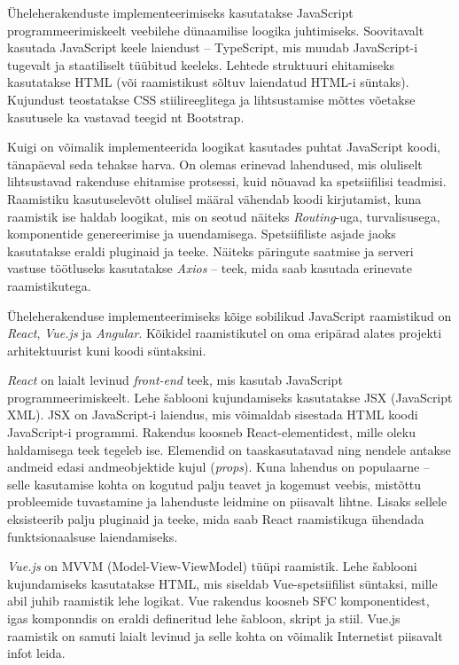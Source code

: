 Üheleherakenduste implementeerimiseks kasutatakse JavaScript programmeerimiskeelt veebilehe dünaamilise 
loogika juhtimiseks. Soovitavalt kasutada JavaScript keele laiendust -- TypeScript, mis muudab JavaScript-i 
tugevalt ja staatiliselt tüübitud keeleks. Lehtede struktuuri ehitamiseks kasutatakse HTML (või raamistikust
sõltuv laiendatud HTML-i süntaks). Kujundust teostatakse CSS stiilireeglitega ja lihtsustamise mõttes
võetakse kasutusele ka vastavad teegid nt Bootstrap.

Kuigi on võimalik implementeerida loogikat kasutades puhtat JavaScript koodi, tänapäeval seda tehakse
harva. On olemas erinevad lahendused, mis oluliselt lihtsustavad rakenduse ehitamise protsessi, kuid 
nõuavad ka spetsiifilisi teadmisi. Raamistiku kasutuselevõtt olulisel määral vähendab koodi kirjutamist,
kuna raamistik ise haldab loogikat, mis on seotud näiteks \textit{Routing}-uga, turvalisusega, komponentide
genereerimise ja uuendamisega. Spetsiifiliste asjade jaoks kasutatakse eraldi pluginaid ja teeke. Näiteks
päringute saatmise ja serveri vastuse töötluseks kasutatakse \textit{Axios} -- teek, mida saab kasutada 
erinevate raamistikutega.

Üheleherakenduse implementeerimiseks kõige sobilikud JavaScript raamistikud on \textit{React}, \textit{Vue.js}
ja \textit{Angular}. Kõikidel raamistikutel on oma eripärad alates projekti arhitektuurist kuni 
koodi süntaksini. 

\textit{React} on laialt levinud \textit{front-end} teek, mis kasutab JavaScript programmeerimiskeelt. 
Lehe šablooni kujundamiseks kasutatakse JSX (JavaScript XML). JSX on JavaScript-i laiendus, mis võimaldab
sisestada HTML koodi JavaScript-i programmi. Rakendus koosneb React-elementidest, mille oleku haldamisega teek
tegeleb ise. Elemendid on taaskasutatavad ning nendele antakse andmeid edasi andmeobjektide kujul (\textit{props}).
Kuna lahendus on populaarne -- selle kasutamise kohta on kogutud palju teavet ja kogemust veebis, mistõttu
probleemide tuvastamine ja lahenduste leidmine on piisavalt lihtne. Lisaks sellele eksisteerib palju pluginaid
ja teeke, mida saab React raamistikuga ühendada funktsionaalsuse laiendamiseks. 

\textit{Vue.js} on MVVM (Model-View-ViewModel) tüüpi raamistik. Lehe šablooni kujundamiseks kasutatakse HTML, 
mis siseldab Vue-spetsiifilist süntaksi, mille abil juhib raamistik lehe logikat. Vue rakendus koosneb SFC 
komponentidest, igas komponndis on eraldi defineritud lehe šabloon, skript ja stiil. Vue.js raamistik on
samuti laialt levinud ja selle kohta on võimalik Internetist piisavalt infot leida.

